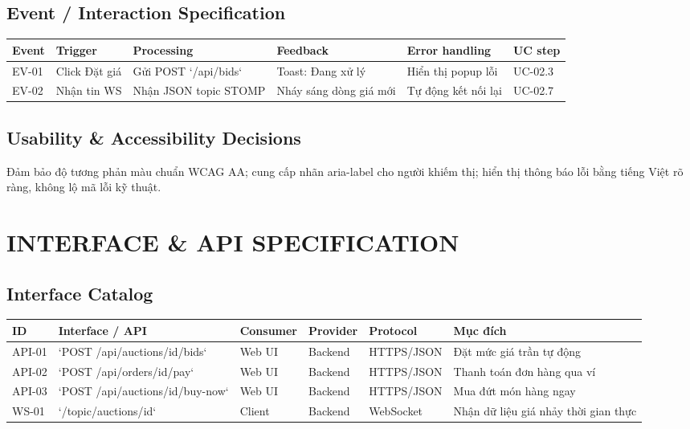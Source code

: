 \documentclass[11pt,a4paper]{article}
\begin{document}
\subsection{Event / Interaction Specification}
\begin{table}[H]
    \centering
    \small
    \begin{tabularx}{\textwidth}{|l|l|X|X|l|l|}
        \hline
        \textbf{Event} & \textbf{Trigger} & \textbf{Processing} & \textbf{Feedback} & \textbf{Error handling} & \textbf{UC step} \\ \hline
        EV-01 & Click Đặt giá & Gửi POST `/api/bids` & Toast: Đang xử lý & Hiển thị popup lỗi & UC-02.3 \\ \hline
        EV-02 & Nhận tin WS & Nhận JSON topic STOMP & Nháy sáng dòng giá mới & Tự động kết nối lại & UC-02.7 \\ \hline
    \end{tabularx}
\end{table}

\subsection{Usability \& Accessibility Decisions}
Đảm bảo độ tương phản màu chuẩn WCAG AA; cung cấp nhãn aria-label cho người khiếm thị; hiển thị thông báo lỗi bằng tiếng Việt rõ ràng, không lộ mã lỗi kỹ thuật.

\section{INTERFACE \& API SPECIFICATION}

\subsection{Interface Catalog}
\begin{table}[H]
    \centering
    \small
    \begin{tabularx}{\textwidth}{|l|l|l|l|l|X|}
        \hline
        \textbf{ID} & \textbf{Interface / API} & \textbf{Consumer} & \textbf{Provider} & \textbf{Protocol} & \textbf{Mục đích} \\ \hline
        API-01 & `POST /api/auctions/{id}/bids` & Web UI & Backend & HTTPS/JSON & Đặt mức giá trần tự động \\ \hline
        API-02 & `POST /api/orders/{id}/pay` & Web UI & Backend & HTTPS/JSON & Thanh toán đơn hàng qua ví \\ \hline
        API-03 & `POST /api/auctions/{id}/buy-now` & Web UI & Backend & HTTPS/JSON & Mua đứt món hàng ngay \\ \hline
        WS-01 & `/topic/auctions/{id}` & Client & Backend & WebSocket & Nhận dữ liệu giá nhảy thời gian thực \\ \hline
    \end{tabularx}
\end{table}
\end{document}
